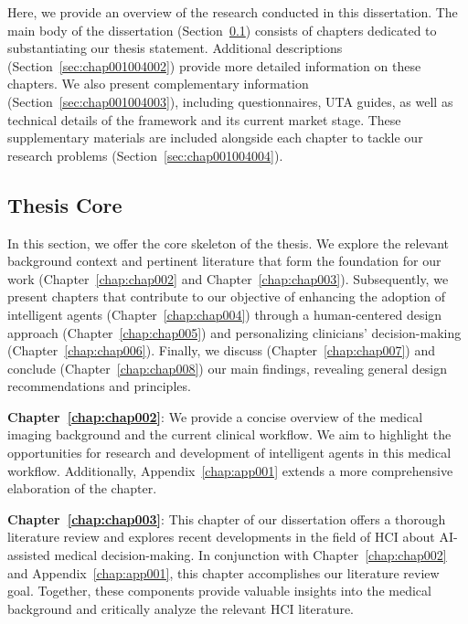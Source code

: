 Here, we provide an overview of the research conducted in this dissertation.
The main body of the dissertation (Section~\ref{sec:chap001004001}) consists of chapters dedicated to substantiating our thesis statement.
Additional descriptions (Section~\ref{sec:chap001004002}) provide more detailed information on these chapters.
We also present complementary information (Section~\ref{sec:chap001004003}), including questionnaires, \ac{UTA} guides, as well as technical details of the framework and its current market stage.
These supplementary materials are included alongside each chapter to tackle our research problems (Section~\ref{sec:chap001004004}).

\subsection{Thesis Core}
\label{sec:chap001004001}

In this section, we offer the core skeleton of the thesis.
We explore the relevant background context and pertinent literature that form the foundation for our work (Chapter~\ref{chap:chap002} and Chapter~\ref{chap:chap003}).
Subsequently, we present chapters that contribute to our objective of enhancing the adoption of intelligent agents (Chapter~\ref{chap:chap004}) through a human-centered design approach (Chapter~\ref{chap:chap005}) and personalizing clinicians' decision-making (Chapter~\ref{chap:chap006}).
Finally, we discuss (Chapter~\ref{chap:chap007}) and conclude (Chapter~\ref{chap:chap008}) our main findings, revealing general design recommendations and principles.

\vspace{2.00mm}

\noindent
{\bf Chapter~\ref{chap:chap002}}:
We provide a concise overview of the medical imaging background and the current clinical workflow.
We aim to highlight the opportunities for research and development of intelligent agents in this medical workflow.
Additionally, Appendix~\ref{chap:app001} extends a more comprehensive elaboration of the chapter.

\vspace{2.00mm}

\noindent
{\bf Chapter~\ref{chap:chap003}}:
This chapter of our dissertation offers a thorough literature review and explores recent developments in the field of \ac{HCI} about \ac{AI}-assisted medical decision-making.
In conjunction with Chapter~\ref{chap:chap002} and Appendix~\ref{chap:app001}, this chapter accomplishes our literature review goal.
Together, these components provide valuable insights into the medical background and critically analyze the relevant \ac{HCI} literature.

